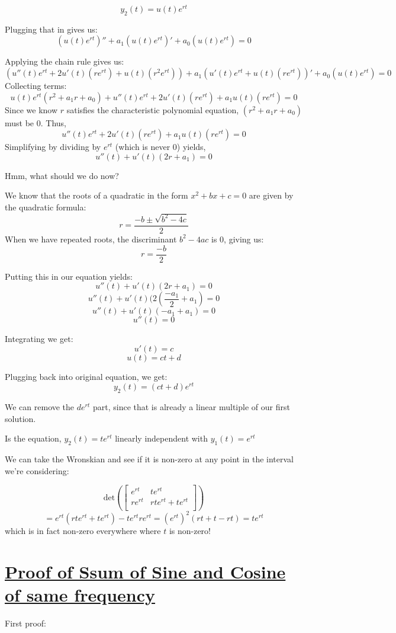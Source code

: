 \documentclass{report}
\begin{document}
$$y_2(t) = u(t)e^{rt}$$

Plugging that in gives us:
$$(u(t)e^{rt})'' + a_1(u(t)e^{rt})' + a_0(u(t)e^{rt}) = 0$$

Applying the chain rule gives us:
$$(u''(t)e^{rt}+2u'(t)(re^{rt}) + u(t)(r^2e^{rt})) + a_1(u'(t)e^{rt} + u(t)(re^{rt}))' + a_0(u(t)e^{rt}) = 0$$
Collecting terms:
$$u(t)e^{rt}(r^2+a_1r+a_0) +u''(t)e^{rt} + 2u'(t)(re^{rt}) + a_1 u(t)(re^{rt}) = 0$$
Since we know $r$ satisfies the characteristic polynomial equation, $(r^2+a_1r+a_0)$ must be 0. Thus,
$$u''(t)e^{rt} + 2u'(t)(re^{rt}) + a_1 u(t)(re^{rt}) = 0$$
Simplifying by dividing by $e^{rt}$ (which is never 0) yields,
$$u''(t) + u'(t)(2r+a_1) = 0$$

Hmm, what should we do now?

We know that the roots of a quadratic in the form $x^2 + bx + c = 0$ are given by the quadratic formula:
$$r = \frac{-b \pm \sqrt{b^2-4c}}{2}$$
When we have repeated roots, the discriminant $b^2-4ac$ is 0, giving us:
$$r = \frac{-b}{2}$$


Putting this in our equation yields:
$$u''(t)+u'(t)(2r+a_1) = 0$$
$$u''(t)+u'(t)(2(\frac{-a_1}{2}+a_1) = 0$$
$$u''(t) + u'(t)(-a_1+a_1) = 0$$
$$u''(t) = 0$$

Integrating we get:
$$u'(t) = c$$
$$u(t) = ct + d$$

Plugging back into original equation, we get:
$$y_2(t) = (ct+d)e^{rt}$$

We can remove the $de^{rt}$ part, since that is already a linear multiple of our first solution.

Is the equation, $y_2(t) = te^{rt}$ linearly independent with $y_1(t) = e^{rt}$

We can take the Wronskian and see if it is non-zero at any point in the interval we're considering:


$$
    \text{det}\left(\begin{bmatrix}
        e^{rt} & te^{rt}\\
        re^{rt} & rte^{rt}+ te^{rt} \\
    \end{bmatrix}\right)
$$
$$
    = e^{rt}(rte^{rt}+te^{rt}) - te^{rt}re^{rt}
    = (e^{rt})^2(rt+t-rt)
    = te^{rt}
$$
which is in fact non-zero everywhere where $t$ is non-zero!

\section{\hyperref[th:sinPlusCosin]{Proof of Ssum of Sine and Cosine of same frequency}}
\label{sec:prSinPlusCosin}
First proof:
\end{document}
